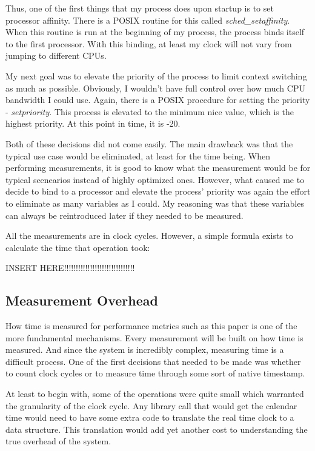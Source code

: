 \documentclass[paper=a4, fontsize=11pt]{scrartcl}
\numberwithin{equation}{section}		%
\numberwithin{figure}{section}			%
\numberwithin{table}{section}				%
\begin{document}
Thus, one of the first things that my process does upon startup is to set processor affinity.  There is a POSIX routine for this called \textit{sched\_setaffinity}.  When this routine is run at the beginning of my process, the process binds itself to the first processor.  With this binding, at least my clock will not vary from jumping to different CPUs.

My next goal was to elevate the priority of the process to limit context switching as much as possible.  Obviously, I wouldn't have full control over how much CPU bandwidth I could use.  Again, there is a POSIX procedure for setting the priority - \textit{setpriority}.  This process is elevated to the minimum nice value, which is the highest priority.  At this point in time, it is -20.

Both of these decisions did not come easily.  The main drawback was that the typical use case would be eliminated, at least for the time being.  When performing measurements, it is good to know what the measurement would be for typical scenearios instead of highly optimized ones.  However, what caused me to decide to bind to a processor and elevate the process' priority was again the effort to eliminate as many variables as I could.  My reasoning was that these variables can always be reintroduced later if they needed to be measured.

All the measurements are in clock cycles.  However, a simple formula exists to calculate the time that operation took:

INSERT HERE!!!!!!!!!!!!!!!!!!!!!!!!!!!!!!

\subsection{Measurement Overhead}

How time is measured for performance metrics such as this paper is one of the more fundamental mechanisms.  Every measurement will be built on how time is measured.  And since the system is incredibly complex, measuring time is a difficult process.  One of the first decisions that needed to be made was whether to count clock cycles or to measure time through some sort of native timestamp.

At least to begin with, some of the operations were quite small which warranted the granularity of the clock cycle.  Any library call that would get the calendar time would need to have some extra code to translate the real time clock to a data structure.  This translation would add yet another cost to understanding the true overhead of the system.
\end{document}
